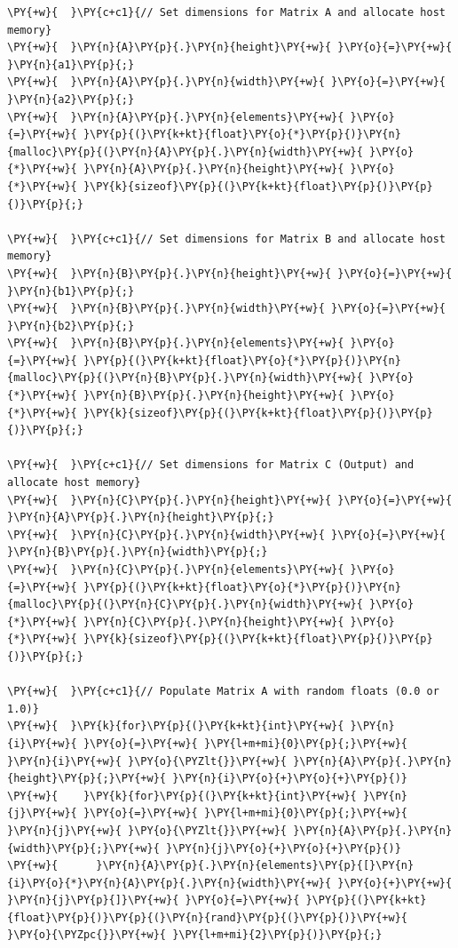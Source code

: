 \begin{Verbatim}[label=\makebox{\url{https://github.com/lucabaldini/cmepda/tree/master/slides/latex/snippets/MatrixMultiplication_global.cu}},commandchars=\\\{\}]
\PY{+w}{  }\PY{c+c1}{// Set dimensions for Matrix A and allocate host memory}
\PY{+w}{  }\PY{n}{A}\PY{p}{.}\PY{n}{height}\PY{+w}{ }\PY{o}{=}\PY{+w}{ }\PY{n}{a1}\PY{p}{;}
\PY{+w}{  }\PY{n}{A}\PY{p}{.}\PY{n}{width}\PY{+w}{ }\PY{o}{=}\PY{+w}{ }\PY{n}{a2}\PY{p}{;}
\PY{+w}{  }\PY{n}{A}\PY{p}{.}\PY{n}{elements}\PY{+w}{ }\PY{o}{=}\PY{+w}{ }\PY{p}{(}\PY{k+kt}{float}\PY{o}{*}\PY{p}{)}\PY{n}{malloc}\PY{p}{(}\PY{n}{A}\PY{p}{.}\PY{n}{width}\PY{+w}{ }\PY{o}{*}\PY{+w}{ }\PY{n}{A}\PY{p}{.}\PY{n}{height}\PY{+w}{ }\PY{o}{*}\PY{+w}{ }\PY{k}{sizeof}\PY{p}{(}\PY{k+kt}{float}\PY{p}{)}\PY{p}{)}\PY{p}{;}

\PY{+w}{  }\PY{c+c1}{// Set dimensions for Matrix B and allocate host memory}
\PY{+w}{  }\PY{n}{B}\PY{p}{.}\PY{n}{height}\PY{+w}{ }\PY{o}{=}\PY{+w}{ }\PY{n}{b1}\PY{p}{;}
\PY{+w}{  }\PY{n}{B}\PY{p}{.}\PY{n}{width}\PY{+w}{ }\PY{o}{=}\PY{+w}{ }\PY{n}{b2}\PY{p}{;}
\PY{+w}{  }\PY{n}{B}\PY{p}{.}\PY{n}{elements}\PY{+w}{ }\PY{o}{=}\PY{+w}{ }\PY{p}{(}\PY{k+kt}{float}\PY{o}{*}\PY{p}{)}\PY{n}{malloc}\PY{p}{(}\PY{n}{B}\PY{p}{.}\PY{n}{width}\PY{+w}{ }\PY{o}{*}\PY{+w}{ }\PY{n}{B}\PY{p}{.}\PY{n}{height}\PY{+w}{ }\PY{o}{*}\PY{+w}{ }\PY{k}{sizeof}\PY{p}{(}\PY{k+kt}{float}\PY{p}{)}\PY{p}{)}\PY{p}{;}

\PY{+w}{  }\PY{c+c1}{// Set dimensions for Matrix C (Output) and allocate host memory}
\PY{+w}{  }\PY{n}{C}\PY{p}{.}\PY{n}{height}\PY{+w}{ }\PY{o}{=}\PY{+w}{ }\PY{n}{A}\PY{p}{.}\PY{n}{height}\PY{p}{;}
\PY{+w}{  }\PY{n}{C}\PY{p}{.}\PY{n}{width}\PY{+w}{ }\PY{o}{=}\PY{+w}{ }\PY{n}{B}\PY{p}{.}\PY{n}{width}\PY{p}{;}
\PY{+w}{  }\PY{n}{C}\PY{p}{.}\PY{n}{elements}\PY{+w}{ }\PY{o}{=}\PY{+w}{ }\PY{p}{(}\PY{k+kt}{float}\PY{o}{*}\PY{p}{)}\PY{n}{malloc}\PY{p}{(}\PY{n}{C}\PY{p}{.}\PY{n}{width}\PY{+w}{ }\PY{o}{*}\PY{+w}{ }\PY{n}{C}\PY{p}{.}\PY{n}{height}\PY{+w}{ }\PY{o}{*}\PY{+w}{ }\PY{k}{sizeof}\PY{p}{(}\PY{k+kt}{float}\PY{p}{)}\PY{p}{)}\PY{p}{;}

\PY{+w}{  }\PY{c+c1}{// Populate Matrix A with random floats (0.0 or 1.0)}
\PY{+w}{  }\PY{k}{for}\PY{p}{(}\PY{k+kt}{int}\PY{+w}{ }\PY{n}{i}\PY{+w}{ }\PY{o}{=}\PY{+w}{ }\PY{l+m+mi}{0}\PY{p}{;}\PY{+w}{ }\PY{n}{i}\PY{+w}{ }\PY{o}{\PYZlt{}}\PY{+w}{ }\PY{n}{A}\PY{p}{.}\PY{n}{height}\PY{p}{;}\PY{+w}{ }\PY{n}{i}\PY{o}{+}\PY{o}{+}\PY{p}{)}
\PY{+w}{    }\PY{k}{for}\PY{p}{(}\PY{k+kt}{int}\PY{+w}{ }\PY{n}{j}\PY{+w}{ }\PY{o}{=}\PY{+w}{ }\PY{l+m+mi}{0}\PY{p}{;}\PY{+w}{ }\PY{n}{j}\PY{+w}{ }\PY{o}{\PYZlt{}}\PY{+w}{ }\PY{n}{A}\PY{p}{.}\PY{n}{width}\PY{p}{;}\PY{+w}{ }\PY{n}{j}\PY{o}{+}\PY{o}{+}\PY{p}{)}
\PY{+w}{      }\PY{n}{A}\PY{p}{.}\PY{n}{elements}\PY{p}{[}\PY{n}{i}\PY{o}{*}\PY{n}{A}\PY{p}{.}\PY{n}{width}\PY{+w}{ }\PY{o}{+}\PY{+w}{ }\PY{n}{j}\PY{p}{]}\PY{+w}{ }\PY{o}{=}\PY{+w}{ }\PY{p}{(}\PY{k+kt}{float}\PY{p}{)}\PY{p}{(}\PY{n}{rand}\PY{p}{(}\PY{p}{)}\PY{+w}{ }\PY{o}{\PYZpc{}}\PY{+w}{ }\PY{l+m+mi}{2}\PY{p}{)}\PY{p}{;}


\end{Verbatim}

